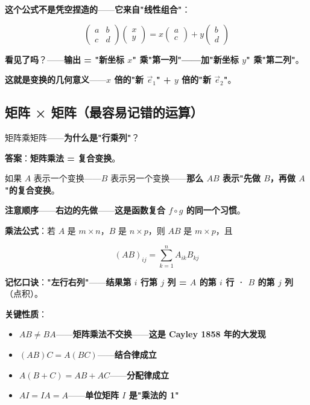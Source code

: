 \textbf{这个公式不是凭空捏造的}——\textbf{它来自"线性组合"}：

\[
\begin{pmatrix} a & b \\ c & d \end{pmatrix}
\begin{pmatrix} x \\ y \end{pmatrix}
= x \begin{pmatrix} a \\ c \end{pmatrix} + y \begin{pmatrix} b \\ d \end{pmatrix}
\]

\textbf{看见了吗}？——\textbf{输出 = "新坐标 $x$" 乘"第一列"——加"新坐标 $y$" 乘"第二列"}。

\textbf{这就是变换的几何意义}——\textbf{$x$ 倍的"新 $\vec{e}_1$" + $y$ 倍的"新 $\vec{e}_2$"}。

\subsection{矩阵 × 矩阵（最容易记错的运算）}

矩阵乘矩阵——\textbf{为什么是"行乘列"}？

\textbf{答案}：\textbf{矩阵乘法 = 复合变换}。

如果 $A$ 表示一个变换——$B$ 表示另一个变换——\textbf{那么 $AB$ 表示"先做 $B$，再做 $A$"的复合变换}。

\textbf{注意顺序}——\textbf{右边的先做}——\textbf{这是函数复合 $f \circ g$ 的同一个习惯}。

\textbf{乘法公式}：若 $A$ 是 $m \times n$，$B$ 是 $n \times p$，则 $AB$ 是 $m \times p$，且

\[
(AB)_{ij} = \sum_{k=1}^{n} A_{ik} B_{kj}
\]

\textbf{记忆口诀}：\textbf{"左行右列"}——\textbf{结果第 $i$ 行第 $j$ 列 = $A$ 的第 $i$ 行 · $B$ 的第 $j$ 列}（点积）。

\textbf{关键性质}：

\begin{itemize}
\item \textbf{$AB \ne BA$}——\textbf{矩阵乘法不交换}——\textbf{这是 Cayley 1858 年的大发现}
\item \textbf{$(AB)C = A(BC)$}——\textbf{结合律成立}
\item \textbf{$A(B+C) = AB + AC$}——\textbf{分配律成立}
\item \textbf{$AI = IA = A$}——\textbf{单位矩阵 $I$ 是"乘法的 1"}
\end{itemize}

